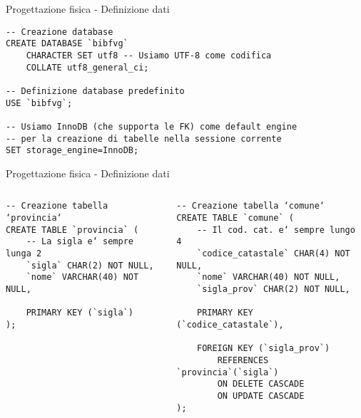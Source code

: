 \begin{frame}[fragile]{Progettazione fisica - Definizione dati}
    \begin{verbatim}
-- Creazione database
CREATE DATABASE `bibfvg`
    CHARACTER SET utf8 -- Usiamo UTF-8 come codifica
    COLLATE utf8_general_ci;

-- Definizione database predefinito
USE `bibfvg`;

-- Usiamo InnoDB (che supporta le FK) come default engine
-- per la creazione di tabelle nella sessione corrente
SET storage_engine=InnoDB;
    \end{verbatim}
\end{frame}

\begin{frame}[fragile]{Progettazione fisica - Definizione dati}
    \begin{columns}[T]
        \begin{column}[T]{.45\textwidth}
            \begin{verbatim}
-- Creazione tabella ‘provincia‘
CREATE TABLE `provincia` (
    -- La sigla e‘ sempre lunga 2
    `sigla` CHAR(2) NOT NULL,
    `nome` VARCHAR(40) NOT NULL,

    PRIMARY KEY (`sigla`)
);
            \end{verbatim}
        \end{column}
        \begin{column}[T]{.45\textwidth}
            \begin{verbatim}
-- Creazione tabella ‘comune‘
CREATE TABLE `comune` (
    -- Il cod. cat. e‘ sempre lungo 4
    `codice_catastale` CHAR(4) NOT NULL,
    `nome` VARCHAR(40) NOT NULL,
    `sigla_prov` CHAR(2) NOT NULL,

    PRIMARY KEY (`codice_catastale`),

    FOREIGN KEY (`sigla_prov`)
        REFERENCES `provincia`(`sigla`)
        ON DELETE CASCADE
        ON UPDATE CASCADE
);
            \end{verbatim}
        \end{column}
    \end{columns}
\end{frame}

